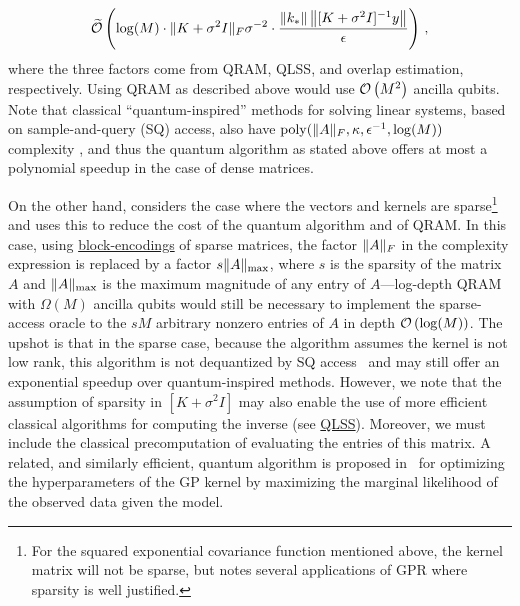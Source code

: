 \begin{refsection}
\begin{equation}
    \widetilde{\mathcal{O}}\left( \log(M) \cdot \lVert K+\sigma^2 I\rVert_F \sigma^{-2} \cdot \frac{\lVert k_*\rVert \left\lVert[K + \sigma^2 I]^{-1}y\right\rVert }{\epsilon} \right)\,,
\end{equation}
where the three factors come from QRAM, QLSS, and overlap estimation, respectively. 
Using QRAM as described above would use $\mathcal{O}\left( M^2 \right)$ ancilla qubits. Note that classical ``quantum-inspired'' methods for solving linear systems, based on sample-and-query (SQ) access, also have $\mathrm{poly}(\lVert A\rVert_F,\kappa,\epsilon^{-1},\log(M))$ complexity \cite{chia2019SampdSubLinLowRankFramework,gilyen2020ImprovedQInspiredAlgorithmForRegression,Shao2022FQILSS}, and thus the quantum algorithm as stated above offers at most a polynomial speedup in the case of dense matrices. 

On the other hand, \cite{zhao2015QAssisstedGaussProcRegr} considers the case where the vectors and kernels are sparse\footnote{For the squared exponential covariance function mentioned above, the kernel matrix will not be sparse, but \cite{zhao2015QAssisstedGaussProcRegr} notes several applications of GPR where sparsity is well justified.} and uses this to reduce the cost of the quantum algorithm and of QRAM. In this case, using \hyperref[prim:BlockEncodings]{block-encodings} of sparse matrices, the factor $\lVert A\rVert_F$ in the complexity expression is replaced by a factor $s \lVert A\rVert_{\max}$, where $s$ is the sparsity of the matrix $A$ and $\lVert A\rVert_{\max}$ is the maximum magnitude of any entry of $A$---log-depth QRAM with $\Omega(M)$ ancilla qubits would still be necessary to implement the sparse-access oracle to the $sM$ arbitrary nonzero entries of $A$ in depth $\mathcal{O}\left( \log(M) \right)$. The upshot is that in the sparse case, because the algorithm assumes the kernel is not low rank, this algorithm is not dequantized by SQ access~\cite{chia2022sampling} and may still offer an exponential speedup over quantum-inspired methods. However, we note that the assumption of sparsity in $[K + \sigma^2 I]$ may also enable the use of more efficient classical algorithms for computing the inverse (see \hyperref[prim:QuantumLinearSystemSolvers]{QLSS}). Moreover, we must include the classical precomputation of evaluating the entries of this matrix. A related, and similarly efficient, quantum algorithm is proposed in~\cite{zhao2019TrainingGaussianProcess} for optimizing the hyperparameters of the GP kernel by maximizing the marginal
likelihood of the observed data
given the model.









\end{refsection}
